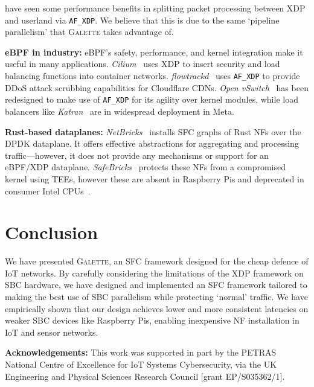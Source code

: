 \documentclass[comsoc, conference, times]{IEEEtran}
\newcommand{\ourtech}{\textsc{Galette}}
\newcommand{\afxdp}{\texttt{AF\_XDP}}
\newcommand{\fakepara}[1]{\noindent\textbf{#1:}}
\begin{document}

\Textcite{DBLP:conf/conext/ShahinfarMSSBA21} have seen some performance benefits in splitting packet processing between XDP and userland via \afxdp.
We believe that this is due to the same `pipeline parallelism' that \ourtech{} takes advantage of.

\fakepara{eBPF in industry}
eBPF's safety, performance, and kernel integration make it useful in many applications.
\emph{Cilium}~\parencite{cilium} uses XDP to insert security and load balancing functions into container networks.
\emph{flowtrackd}~\parencite{flowtrackd} uses \afxdp{} to provide DDoS attack scrubbing capabilities for Cloudflare CDNs.
\emph{Open vSwitch}~\parencite{DBLP:conf/sigcomm/TuWAP21} has been redesigned to make use of \afxdp{} for its agility over kernel modules, while load balancers like \emph{Katran}~\parencite{katran} are in widespread deployment in Meta.

\fakepara{Rust-based dataplanes}
\emph{NetBricks}~\parencite{DBLP:conf/osdi/PandaHJWRS16} installs SFC graphs of Rust NFs over the DPDK dataplane.
It offers effective abstractions for aggregating and processing traffic---however, it does not provide any mechanisms or support for an eBPF/XDP dataplane.
\emph{SafeBricks}~\parencite{DBLP:conf/nsdi/PoddarLPR18} protects these NFs from a compromised kernel using TEEs, however these are absent in Raspberry Pis and deprecated in consumer Intel CPUs~\parencite{sgx-depr}.


\section{Conclusion}
We have presented \ourtech, an SFC framework designed for the cheap defence of IoT networks.
By carefully considering the limitations of the XDP framework on SBC hardware, we have designed and implemented an SFC framework tailored to making the best use of SBC parallelism while protecting `normal' traffic.
We have empirically shown that our design achieves lower and more consistent latencies on weaker SBC devices like Raspberry Pis, enabling inexpensive NF installation in IoT and sensor networks.

\fakepara{Acknowledgements}
This work was supported in part by the PETRAS National Centre of Excellence for IoT Systems Cybersecurity, via the UK Engineering and Physical Sciences
Research Council [grant EP/S035362/1].

\printbibliography
\end{document}
